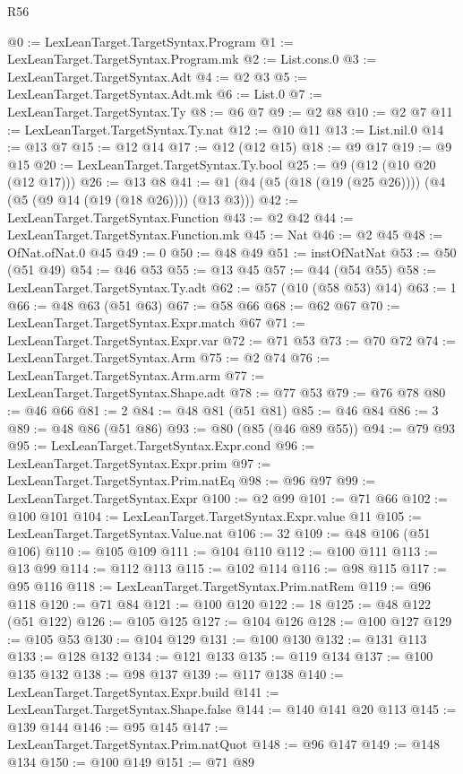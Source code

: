 \begin{lexlean}{R56}
\begin{coremodule}
@0 := LexLeanTarget.TargetSyntax.Program
@1 := LexLeanTarget.TargetSyntax.Program.mk
@2 := List.cons.{0}
@3 := LexLeanTarget.TargetSyntax.Adt
@4 := @2 @3
@5 := LexLeanTarget.TargetSyntax.Adt.mk
@6 := List.{0}
@7 := LexLeanTarget.TargetSyntax.Ty
@8 := @6 @7
@9 := @2 @8
@10 := @2 @7
@11 := LexLeanTarget.TargetSyntax.Ty.nat
@12 := @10 @11
@13 := List.nil.{0}
@14 := @13 @7
@15 := @12 @14
@17 := @12 (@12 @15)
@18 := @9 @17
@19 := @9 @15
@20 := LexLeanTarget.TargetSyntax.Ty.bool
@25 := @9 (@12 (@10 @20 (@12 @17)))
@26 := @13 @8
@41 := @1 (@4 (@5 (@18 (@19 (@25 @26)))) (@4 (@5 (@9 @14 (@19 (@18 @26)))) (@13 @3)))
@42 := LexLeanTarget.TargetSyntax.Function
@43 := @2 @42
@44 := LexLeanTarget.TargetSyntax.Function.mk
@45 := Nat
@46 := @2 @45
@48 := OfNat.ofNat.{0} @45
@49 := 0
@50 := @48 @49
@51 := instOfNatNat
@53 := @50 (@51 @49)
@54 := @46 @53
@55 := @13 @45
@57 := @44 (@54 @55)
@58 := LexLeanTarget.TargetSyntax.Ty.adt
@62 := @57 (@10 (@58 @53) @14)
@63 := 1
@66 := @48 @63 (@51 @63)
@67 := @58 @66
@68 := @62 @67
@70 := LexLeanTarget.TargetSyntax.Expr.match @67
@71 := LexLeanTarget.TargetSyntax.Expr.var
@72 := @71 @53
@73 := @70 @72
@74 := LexLeanTarget.TargetSyntax.Arm
@75 := @2 @74
@76 := LexLeanTarget.TargetSyntax.Arm.arm
@77 := LexLeanTarget.TargetSyntax.Shape.adt
@78 := @77 @53
@79 := @76 @78
@80 := @46 @66
@81 := 2
@84 := @48 @81 (@51 @81)
@85 := @46 @84
@86 := 3
@89 := @48 @86 (@51 @86)
@93 := @80 (@85 (@46 @89 @55))
@94 := @79 @93
@95 := LexLeanTarget.TargetSyntax.Expr.cond
@96 := LexLeanTarget.TargetSyntax.Expr.prim
@97 := LexLeanTarget.TargetSyntax.Prim.natEq
@98 := @96 @97
@99 := LexLeanTarget.TargetSyntax.Expr
@100 := @2 @99
@101 := @71 @66
@102 := @100 @101
@104 := LexLeanTarget.TargetSyntax.Expr.value @11
@105 := LexLeanTarget.TargetSyntax.Value.nat
@106 := 32
@109 := @48 @106 (@51 @106)
@110 := @105 @109
@111 := @104 @110
@112 := @100 @111
@113 := @13 @99
@114 := @112 @113
@115 := @102 @114
@116 := @98 @115
@117 := @95 @116
@118 := LexLeanTarget.TargetSyntax.Prim.natRem
@119 := @96 @118
@120 := @71 @84
@121 := @100 @120
@122 := 18
@125 := @48 @122 (@51 @122)
@126 := @105 @125
@127 := @104 @126
@128 := @100 @127
@129 := @105 @53
@130 := @104 @129
@131 := @100 @130
@132 := @131 @113
@133 := @128 @132
@134 := @121 @133
@135 := @119 @134
@137 := @100 @135 @132
@138 := @98 @137
@139 := @117 @138
@140 := LexLeanTarget.TargetSyntax.Expr.build
@141 := LexLeanTarget.TargetSyntax.Shape.false
@144 := @140 @141 @20 @113
@145 := @139 @144
@146 := @95 @145
@147 := LexLeanTarget.TargetSyntax.Prim.natQuot
@148 := @96 @147
@149 := @148 @134
@150 := @100 @149
@151 := @71 @89

\end{coremodule}
\end{lexlean}
